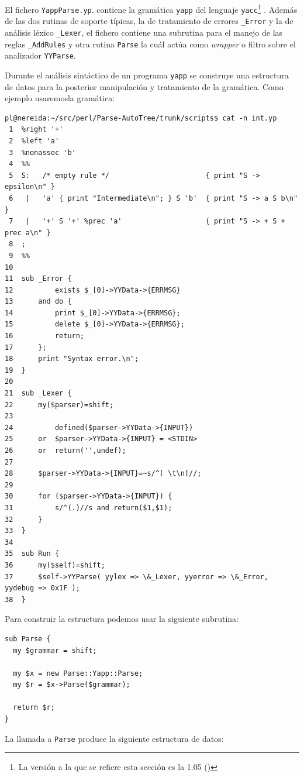 El fichero \verb|YappParse.yp|.
contiene la gramática \verb|yapp| del lenguaje
\verb|yacc|\footnote{La versión a la que se refiere esta sección es la 1.05
()}
. 
Además de las dos rutinas de soporte típicas,
la de tratamiento de errores \verb|_Error| y la
de análisis léxico \verb|_Lexer|, el fichero
contiene una subrutina para el manejo de las 
reglas \verb|_AddRules| y otra rutina \verb|Parse| la cuál
 actúa como \emph{wrapper} o filtro sobre el analizador
\verb|YYParse|.

Durante el análisis sintáctico 
de un programa \verb|yapp| se construye una estructura de 
datos para la posterior manipulación y tratamiento de 
la gramática.  
Como ejemplo usaremosla gramática:
\begin{verbatim}
pl@nereida:~/src/perl/Parse-AutoTree/trunk/scripts$ cat -n int.yp
 1  %right '+'
 2  %left 'a'
 3  %nonassoc 'b'
 4  %%
 5  S:   /* empty rule */                       { print "S -> epsilon\n" }
 6   |   'a' { print "Intermediate\n"; } S 'b'  { print "S -> a S b\n" }
 7   |   '+' S '+' %prec 'a'                    { print "S -> + S + prec a\n" }
 8  ;
 9  %%
10
11  sub _Error {
12          exists $_[0]->YYData->{ERRMSG}
13      and do {
14          print $_[0]->YYData->{ERRMSG};
15          delete $_[0]->YYData->{ERRMSG};
16          return;
17      };
18      print "Syntax error.\n";
19  }
20
21  sub _Lexer {
22      my($parser)=shift;
23
24          defined($parser->YYData->{INPUT})
25      or  $parser->YYData->{INPUT} = <STDIN>
26      or  return('',undef);
27
28      $parser->YYData->{INPUT}=~s/^[ \t\n]//;
29
30      for ($parser->YYData->{INPUT}) {
31          s/^(.)//s and return($1,$1);
32      }
33  }
34
35  sub Run {
36      my($self)=shift;
37      $self->YYParse( yylex => \&_Lexer, yyerror => \&_Error, yydebug => 0x1F );
38  }
\end{verbatim}
Para construir la estructura podemos usar la siguiente subrutina:
\begin{verbatim}
sub Parse {
  my $grammar = shift;

  my $x = new Parse::Yapp::Parse;
  my $r = $x->Parse($grammar);

  return $r;
}
\end{verbatim}
La llamada a \verb|Parse| produce la siguiente estructura de datos:
